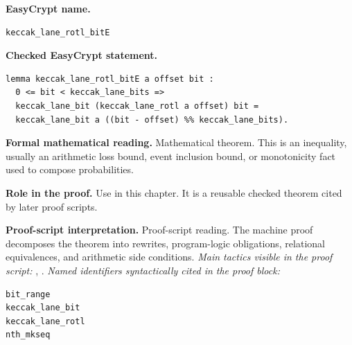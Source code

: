 \begin{formaltheorem}
\noindent\textbf{EasyCrypt name.}
\begin{lstlisting}[language=EasyCrypt,basicstyle=\ttfamily\scriptsize]
keccak_lane_rotl_bitE
\end{lstlisting}
\noindent\textbf{Checked EasyCrypt statement.}
\begin{lstlisting}[language=EasyCrypt,basicstyle=\ttfamily\scriptsize]
lemma keccak_lane_rotl_bitE a offset bit :
  0 <= bit < keccak_lane_bits =>
  keccak_lane_bit (keccak_lane_rotl a offset) bit =
  keccak_lane_bit a ((bit - offset) %% keccak_lane_bits).
\end{lstlisting}
\noindent\textbf{Formal mathematical reading.}
Mathematical theorem. This is an inequality, usually an arithmetic loss bound, event inclusion bound, or monotonicity fact used to compose probabilities.

\noindent\textbf{Role in the proof.}
Use in this chapter. It is a reusable checked theorem cited by later proof scripts.

\noindent\textbf{Proof-script interpretation.}
Proof-script reading. The machine proof decomposes the theorem into rewrites, program-logic obligations, relational equivalences, and arithmetic side conditions.
\emph{Main tactics visible in the proof script:} , .
\emph{Named identifiers syntactically cited in the proof block:}
\begin{lstlisting}[language=EasyCrypt,basicstyle=\ttfamily\scriptsize]
bit_range
keccak_lane_bit
keccak_lane_rotl
nth_mkseq
\end{lstlisting}

\end{formaltheorem}

